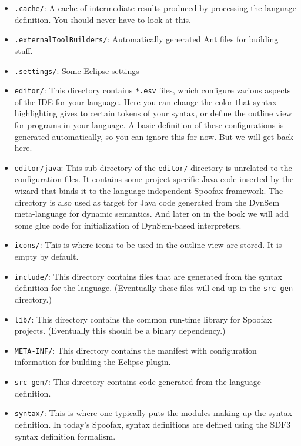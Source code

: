 \begin{itemize}

  \item \texttt{.cache/}: A cache of intermediate results produced by processing
  the language definition. You should never have to look at this.
  \item \texttt{.externalToolBuilders/}: Automatically generated Ant files for
  building stuff.
  \item \texttt{.settings/}: Some Eclipse settings \item \texttt{editor/}: This
  directory contains \texttt{*.esv} files, which configure various aspects of
  the IDE for your language. Here you can change the color that syntax
  highlighting gives to certain tokens of your syntax, or define the outline
  view for programs in your language. A basic definition of these configurations
  is generated automatically, so you can ignore this for now. But we will get
  back here.
  \item \texttt{editor/java}: This sub-directory of the \texttt{editor/}
  directory is unrelated to the configuration files. It contains some
  project-specific Java code inserted by the wizard that binds it to the
  language-independent Spoofax framework. The directory is also used as target
  for Java code generated from the DynSem meta-language for dynamic semantics.
  And later on in the book we will add some glue code for initialization of
  DynSem-based interpreters.
  \item \texttt{icons/}: This is where icons to be used in the outline view are
  stored. It is empty by default.
  \item \texttt{include/}: This directory contains files that are generated from
  the syntax definition for the language. (Eventually these files will end up in
  the \texttt{src-gen} directory.) 
  \item \texttt{lib/}: This directory contains the common run-time library for
  Spoofax projects. (Eventually this should be a binary dependency.) 
  \item \texttt{META-INF/}: This directory contains the
  manifest with configuration information for building the Eclipse plugin.
  \item \texttt{src-gen/}: This directory contains code generated from the
  language definition.
  \item \texttt{syntax/}: This is where one typically puts the modules making up
  the syntax definition. In today's Spoofax, syntax definitions are defined
  using the SDF3 syntax definition formalism.

\end{itemize}
